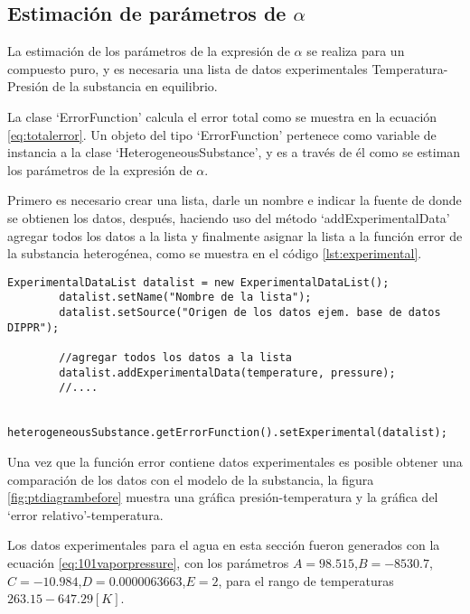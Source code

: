 \subsection{Estimación de parámetros de $\alpha$}\label{subsec:alphaoptim}

	La estimación de los parámetros de la expresión de $\alpha$ se realiza para un compuesto puro, y es necesaria una lista de datos experimentales Temperatura-Presión  de la substancia en equilibrio. 

	La clase `ErrorFunction' calcula el error total como se muestra en la ecuación \ref{eq:totalerror}. Un objeto del tipo `ErrorFunction' pertenece como variable de instancia a la clase `HeterogeneousSubstance', y es a través de él como se estiman los parámetros de la expresión de $\alpha$.

	Primero es necesario crear una lista, darle un nombre e indicar la fuente de donde se obtienen los datos, después, haciendo uso del método `addExperimentalData' agregar todos los datos a la lista y finalmente asignar la lista a la función error de la substancia heterogénea, como se muestra en el código \ref{lst:experimental}.

	\begin{lstlisting}[label={lst:experimental},caption={Creación de una lista de datos experimentales presión-temperatura con la clase `ExperimentalDataList'}]
		ExperimentalDataList datalist = new ExperimentalDataList();
		datalist.setName("Nombre de la lista");
		datalist.setSource("Origen de los datos ejem. base de datos DIPPR");

		//agregar todos los datos a la lista
		datalist.addExperimentalData(temperature, pressure);
		//....

		heterogeneousSubstance.getErrorFunction().setExperimental(datalist);
	\end{lstlisting}

	Una vez que la función error contiene datos experimentales es posible obtener una comparación de los datos con el modelo de la substancia, la figura \ref{fig:ptdiagrambefore} muestra una gráfica presión-temperatura y la gráfica del `error relativo'-temperatura.


	Los datos experimentales para el agua en esta sección fueron generados con la ecuación \ref{eq:101vaporpressure}, con los parámetros $A = 98.515$,$B=-8530.7$,$C=-10.984$,$D=0.0000063663$,$E=2$, para el rango de temperaturas $263.15-647.29 [K]$.

